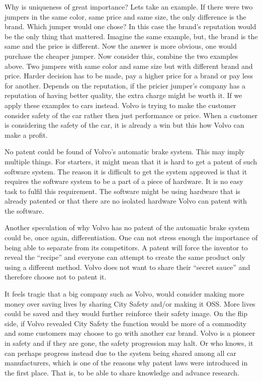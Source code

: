 \documentclass[conference]{IEEEtran}
\begin{document}
Why is uniqueness of great importance? Lets take an example. If there were two jumpers in the same color, same price and same size, the only difference is the brand. Which jumper would one chose? In this case the brand's reputation would be the only thing that mattered. Imagine the same example, but, the brand is the same and the price is different. Now the answer is more obvious, one would purchase the cheaper jumper. Now consider this, combine the two examples above. Two jumpers with same color and same size but with different brand and price. Harder decision has to be made, pay a higher price for a brand or pay less for another. Depends on the reputation, if the pricier jumper's company has a reputation of having better quality, the extra charge might be worth it. If we apply these examples to cars instead. Volvo is trying to make the customer consider safety of the car rather then just performance or price. When a customer is considering the safety of the car, it is already a win but this how Volvo can make a profit.


No patent could be found of Volvo's automatic brake system. This may imply multiple things. For starters, it might mean that it is hard to get a patent of such software system. The reason it is difficult to get the system approved is that it requires the software system to be a part of a piece of hardware. It is no easy task to fulfil this requirement. The software might be using hardware that is already patented or that there are no isolated hardware Volvo can patent with the software. 

Another speculation of why Volvo has no patent of the automatic brake system could be, once again, differentiation. One can not stress enough the importance of being able to separate from its competitors. A patent will force the inventor to reveal the ``recipe'' and everyone can attempt to create the same product only using a different method. Volvo does not want to share their ``secret sauce'' and therefore choose not to patent it. 

It feels tragic that a big company such as Volvo, would consider making more money over saving lives by sharing City Safety and/or making it OSS. More lives could be saved and they would further reinforce their safety image. On the flip side, if Volvo revealed City Safety the function would be more of a commodity and some customers may choose to go with another car brand. Volvo is a pioneer in safety and if they are gone, the safety progression may halt. Or who knows, it can perhaps progress instead due to the system being shared among all car manufacturers, which is one of the reasons why patent laws were introduced in the first place. That is, to be able to share knowledge and advance research.\cite{SoftwarePatent}
\iffalse
\end{document}

